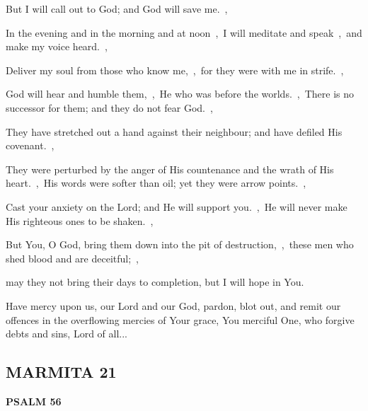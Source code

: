 \documentclass[12pt,twoside,a5paper]{article}
\newcommand{\marmita}[1]{\subsection*{MARMITA {#1}}}
\newcommand{\psalm}[1]{\textbf{PSALM {#1}}\nopagebreak}
\newcommand{\slota}[1]{\liturgicalhint{Slota.} #1}
\begin{document}
\begin{normalparskip}
  But I will call out to God; and God will save me.~\sep

  In the evening and in the morning and at noon~\sep\ I will meditate and speak~\sep\ and make my voice heard.~\sep

  Deliver my soul from those who know me,~\sep\ for they were with me in strife.~\sep

  God will hear and humble them,~\sep\ He who was before the worlds.~\sep\ There is no successor for them; and they do not fear God.~\sep

  They have stretched out a hand against their neighbour; and have defiled His covenant.~\sep

  They were perturbed by the anger of His countenance and the wrath of His heart.~\sep\ His words were softer than oil; yet they were arrow points.~\sep

  Cast your anxiety on the Lord; and He will support you.~\sep\ He will never make His righteous ones to be shaken.~\sep

  But You, O God, bring them down into the pit of destruction,~\sep\ these men who shed blood and are deceitful;~\sep

  may they not bring their days to completion, but I will hope in You.
\end{normalparskip}

\slota{Have mercy upon us, our Lord and our God, pardon, blot out, and remit our offences in the overflowing mercies of Your grace, You merciful One, who forgive debts and sins, Lord of all...}

\marmita{21}

\psalm{56}
\end{document}
